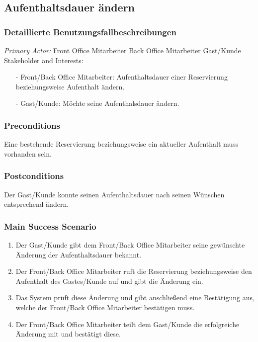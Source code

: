 \documentclass[./detailed_overview_usecases.tex]{subfiles}
\begin{document}
    \subsection{Aufenthaltsdauer ändern}
    \subsubsection{Detaillierte Benutzungsfallbeschreibungen}
    \textit{Primary Actor:}
    Front Office Mitarbeiter
	Back Office Mitarbeiter
	Gast/Kunde
    \\
    Stakeholder and Interests:
    \begin{itemize}
        \item[-] Front/Back Office Mitarbeiter: Aufenthaltsdauer einer Reservierung beziehungsweise Aufenthalt ändern.
        \item[-] Gast/Kunde: Möchte seine Aufenthalsdauer ändern.
    \end{itemize}

    \subsubsection*{Preconditions}
	Eine bestehende Reservierung beziehungsweise ein aktueller Aufenthalt muss vorhanden sein.
	
    \subsubsection*{Postconditions}
    Der Gast/Kunde konnte seinen Aufenthaltsdauer nach seinen Wünschen entsprechend ändern.
	
    \subsubsection*{Main Success Scenario}
    \begin{enumerate}
        \item Der Gast/Kunde gibt dem Front/Back Office Mitarbeiter seine gewünschte Änderung der Aufenthaltsdauer bekannt.
        \item Der Front/Back Office Mitarbeiter ruft die Reservierung beziehungsweise den Aufenthalt des Gastes/Kunde auf und gibt die Änderung ein.
	    \item Das System prüft diese Änderung und gibt anschließend eine Bestätigung aus, welche der Front/Back Office Mitarbeiter bestätigen muss.
	    \item Der Front/Back Office Mitarbeiter teilt dem Gast/Kunde die erfolgreiche Änderung mit und bestätigt diese.
    \end{enumerate}
\end{document}
